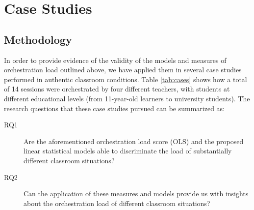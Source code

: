\documentclass[10pt,journal,compsoc]{IEEEtran}
\begin{document}



\section{Case Studies}
\label{sec:eval}

\subsection{Methodology}

In order to provide evidence of the validity of the models and measures of orchestration load outlined above, we have applied them in several case studies performed in authentic classroom conditions. Table \ref{tab:cases} shows how a total of 14 sessions were orchestrated by four different teachers, with students at different educational levels (from 11-year-old learners to university students). The research questions that these case studies pursued can be summarized as:

\begin{description}
\item[RQ1] Are the aforementioned orchestration load score (OLS) and the proposed linear statistical models able to discriminate the load of substantially different classroom situations?
\item[RQ2] Can the application of these measures and models provide us with insights about the orchestration load of different classroom situations?
\end{description}
\end{document}
